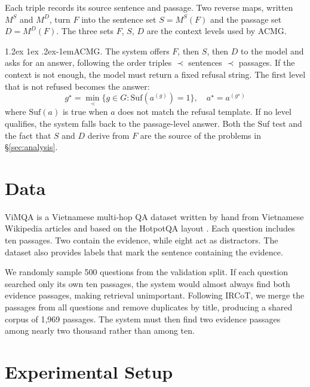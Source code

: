 \documentclass[11pt]{article}
\makeatletter
\renewcommand\paragraph{\@startsection{paragraph}{4}{\z@}%
  {1.2ex \@plus1ex \@minus.2ex}{-1em}{\normalfont\normalsize\bfseries}}
\makeatother
\begin{document}
Each triple records its source sentence and passage. Two reverse maps, written $M^S$ and
$M^D$, turn $F$ into the sentence set $S = M^S(F)$ and the passage set $D = M^D(F)$. The
three sets $F$, $S$, $D$ are the context levels used by ACMG.

\paragraph{ACMG.} The system offers $F$, then $S$, then $D$ to the model and asks for an
answer, following the order triples $\prec$ sentences $\prec$ passages. If the context is
not enough, the model must return a fixed refusal string. The first level that is not
refused becomes the answer:
\begin{equation}
\label{eq:acmg}
g^\star = \min_{\prec}\{g \in G : \mathrm{Suf}(a^{(g)}) = 1\},\quad a^\star = a^{(g^\star)}
\end{equation}
where $\mathrm{Suf}(a)$ is true when $a$ does not match the refusal template. If no level
qualifies, the system falls back to the passage-level answer. Both the $\mathrm{Suf}$ test
and the fact that $S$ and $D$ derive from $F$ are the source of the problems in
\S\ref{sec:analysis}.

\section{Data}
\label{sec:data}

ViMQA \citep{le2022vimqa} is a Vietnamese multi-hop QA dataset written by hand from
Vietnamese Wikipedia articles and based on the HotpotQA layout
\citep{yang2018hotpotqa}. Each question includes ten passages. Two contain the evidence,
while eight act as distractors. The dataset also provides labels that mark the sentence
containing the evidence.

We randomly sample 500 questions from the validation split. If each question searched only
its own ten passages, the system would almost always find both evidence passages, making
retrieval unimportant. Following IRCoT, we merge the passages from all questions and remove
duplicates by title, producing a shared corpus of 1,969 passages. The system must then find
two evidence passages among nearly two thousand rather than among ten.

\section{Experimental Setup}
\label{sec:setup}
\end{document}
